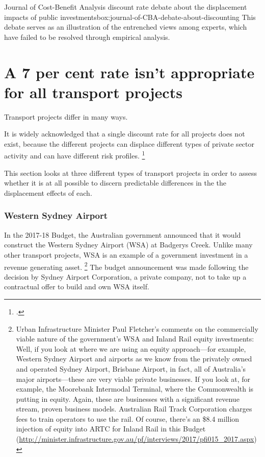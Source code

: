 \begin{bigbox}{Journal of Cost-Benefit Analysis discount rate debate about the displacement impacts of public investments}{box:journal-of-CBA-debate-about-discounting}
This debate serves as an illustration of the entrenched views among experts, which have failed to be resolved through empirical analysis.

\end{bigbox}


\section{A 7 per cent rate isn’t appropriate for all transport projects}\label{section:examples-of-displacement-effects-of-transport-projects}
Transport projects differ in many ways. 

It is widely acknowledged that a single discount rate for all projects does not exist, because the different projects can displace different types of private sector activity and can have different risk profiles.%
    \footcite[][61]{Harrison-Valuing-the-Future}

This section looks at three different types of transport projects in order to assess whether it is at all possible to discern predictable differences in the the displacement effects of each. 

\subsubsection{Western Sydney Airport}
In the 2017-18 Budget, the Australian government announced that it would construct the Western Sydney Airport (WSA) at Badgerys Creek. Unlike many other transport projects, WSA is an example of a government investment in a revenue generating asset.%
    \footnote{Urban Infrastructure Minister Paul Fletcher's comments on the commercially viable nature of the government's WSA and Inland Rail equity investments: Well, if you look at where we are using an equity approach—for example, Western Sydney Airport and airports as we know from the privately owned and operated Sydney Airport, Brisbane Airport, in fact, all of Australia's major airports—these are very viable private businesses. If you look at, for example, the Moorebank Intermodal Terminal, where the Commonwealth is putting in equity. Again, these are businesses with a significant revenue stream, proven business models. Australian Rail Track Corporation charges fees to train operators to use the rail. Of course, there's an \$8.4 million injection of equity into ARTC for Inland Rail in this Budget (\url{http://minister.infrastructure.gov.au/pf/interviews/2017/pfi015_2017.aspx})}
The budget announcement was made following the decision by Sydney Airport Corporation, a private company, not to take up a contractual offer to build and own WSA itself. 

